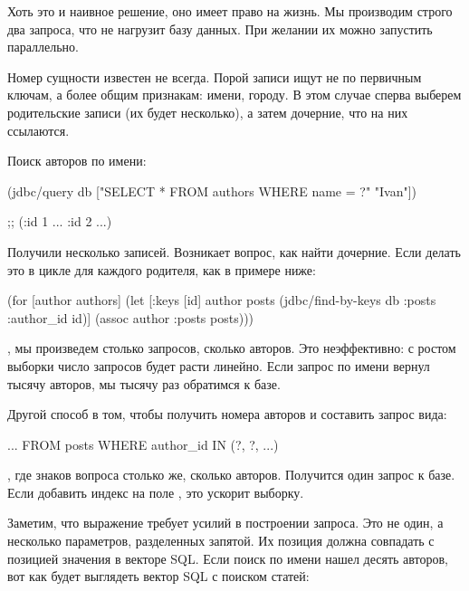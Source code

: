 Хоть это и наивное решение, оно имеет право на жизнь. Мы производим строго два запроса, что не нагрузит базу данных. При желании их можно запустить параллельно.

Номер сущности известен не всегда. Порой записи ищут не по первичным ключам, а более общим признакам: имени, городу. В этом случае сперва выберем родительские записи (их будет несколько), а затем дочерние, что на них ссылаются.

Поиск авторов по имени:

\begin{english}
  \begin{clojure}
(jdbc/query db ["SELECT * FROM authors WHERE name = ?" "Ivan"])

;; ({:id 1 ...} {:id 2 ...})
  \end{clojure}
\end{english}

Получили несколько записей. Возникает вопрос, как найти дочерние. Если делать это в цикле для каждого родителя, как в примере ниже:

\begin{english}
  \begin{clojure}
(for [author authors]
  (let [{:keys [id]} author
        posts (jdbc/find-by-keys db :posts {:author_id id})]
    (assoc author :posts posts)))
  \end{clojure}
\end{english}

, мы произведем столько запросов, сколько авторов. Это неэффективно: с ростом выборки число запросов будет расти линейно. Если запрос по имени вернул тысячу авторов, мы тысячу раз обратимся к базе.

Другой способ в том, чтобы получить номера авторов и составить запрос вида:

\begin{english}
  \begin{sql}
... FROM posts WHERE author_id IN (?, ?, ...)
  \end{sql}
\end{english}

, где знаков вопроса столько же, сколько авторов. Получится один запрос к базе. Если добавить индекс на поле , это ускорит выборку.

Заметим, что выражение  требует усилий в построении запроса. Это не один, а несколько параметров, разделенных запятой. Их позиция должна совпадать с позицией значения в векторе SQL. Если поиск по имени нашел десять авторов, вот как будет выглядеть вектор SQL с поиском статей:

